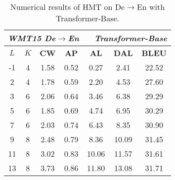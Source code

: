 \documentclass{article} %
\begin{document}
\begin{table}[h]
\small
\centering
\caption{Numerical results of HMT on De$\rightarrow$En with Transformer-Base.}
\label{table:deen_base_res}
\vspace{-0.05in}
\begin{tabular}{cc|cccc|c} \hline
\multicolumn{7}{c}{\textit{\textbf{WMT15 De$\rightarrow$En $\;\;\;\;$ Transformer-Base}}}                                   \\ \hline
$L$ & $K$ & \textbf{CW} & \textbf{AP} & \textbf{AL} & \textbf{DAL} & \textbf{BLEU} \\ \hline
-1         & 4          & 1.58        & 0.52        & 0.27        & 2.41         & 22.52         \\
2          & 4          & 1.78        & 0.59        & 2.20        & 4.53         & 27.60         \\
3          & 6          & 2.06        & 0.64        & 3.46        & 6.38         & 29.29         \\
5          & 6          & 1.85        & 0.69        & 4.74        & 6.95         & 30.29         \\
7          & 6          & 2.03        & 0.74        & 6.43        & 8.35         & 30.90         \\
9          & 8          & 2.48        & 0.79        & 8.36        & $\!\!\!$10.09        & 31.45         \\
11         & 8          & 3.02        & 0.83        & $\!\!\!$10.06       & $\!\!\!$11.57        & 31.61         \\
13         & 8          & 3.73        & 0.86        & $\!\!\!$11.80       & $\!\!\!$13.08        & 31.71        \\\hline
\end{tabular}
\end{table}
\end{document}
